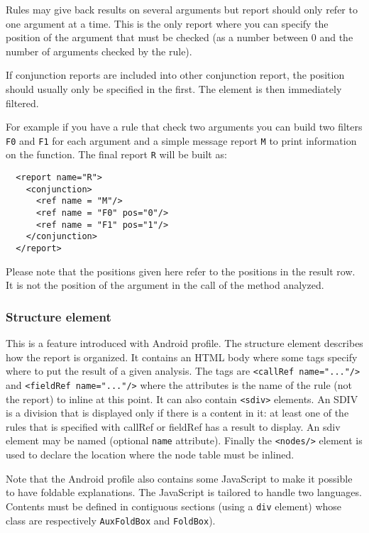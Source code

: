 \begin{itemize}
  Rules may give back results on several arguments but report should only refer
  to one argument at a time. This is the only report where you can specify the
  position of the argument that must be checked (as a number between 0 and the
  number of arguments checked by the rule).
  
  If conjunction reports are included into other conjunction report, the
  position should usually only be specified in the first. The element is then
  immediately filtered.
  
  For example if you have a rule that check two arguments you can build two
  filters \texttt{F0} and \texttt{F1} for each argument and a simple message
  report \texttt{M} to print information on the function. The final report
  \texttt{R} will be built as:
\begin{verbatim}
  <report name="R">
    <conjunction>
      <ref name = "M"/>
      <ref name = "F0" pos="0"/>
      <ref name = "F1" pos="1"/>
    </conjunction>
  </report>
\end{verbatim}
  Please note that the positions given here refer to the positions in the result
  row.  It is not the position of the argument in the call of the method
  analyzed.
\end{itemize}

\subsubsection{Structure element}
This is a feature introduced with Android profile. The structure element
describes how the report is organized. It contains an HTML body where some tags
specify where to put the result of a given analysis. The tags are
\verb!<callRef name="..."/>! and \verb!<fieldRef name="..."/>! where the
attributes is the name of the rule (not the report) to inline at this point.
It can also contain \verb!<sdiv>! elements. An SDIV is a division that is
displayed only if there is a content in it: at least one of the rules that is
specified with callRef or fieldRef has a result to display. An sdiv element
may be named (optional \verb!name! attribute). Finally the \verb!<nodes/>!
element is used to declare the location where the node table must be inlined.

Note that the Android profile also contains some JavaScript to make it possible
to have foldable explanations. The JavaScript is tailored to handle two
languages. Contents must be defined in contiguous sections (using a \verb!div!
element) whose class are respectively \verb!AuxFoldBox! and \verb!FoldBox!).

